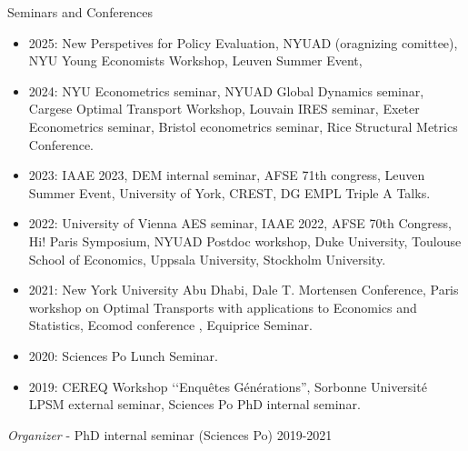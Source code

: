 \documentclass{resume} %
\begin{document}
\begin{rSection}{Seminars and Conferences}
\begin{itemize}
  \item 2025: New Perspetives for Policy Evaluation, NYUAD (oragnizing comittee), NYU Young Economists Workshop, Leuven Summer Event, 
  \item 2024: NYU Econometrics seminar, NYUAD Global Dynamics seminar, Cargese Optimal Transport Workshop, Louvain IRES seminar, Exeter Econometrics seminar, Bristol econometrics seminar, Rice Structural Metrics Conference.  
  \item 2023: IAAE 2023, DEM internal seminar, AFSE 71th congress, Leuven Summer Event, University of York, CREST, DG EMPL Triple A Talks.
  \item 2022: University of Vienna AES seminar, IAAE 2022, AFSE 70th Congress, Hi! Paris Symposium, NYUAD Postdoc workshop, Duke University, Toulouse School of Economics, Uppsala University, Stockholm University.
  \item 2021: New York University Abu Dhabi, Dale T. Mortensen Conference, Paris workshop on Optimal Transports with applications to Economics and Statistics, Ecomod conference , Equiprice Seminar.
  \item 2020: Sciences Po Lunch Seminar.
  \item 2019: CEREQ Workshop ‘‘Enquêtes Générations'', Sorbonne Université LPSM external seminar, Sciences Po PhD internal seminar.
\end{itemize}

{\em Organizer} - PhD internal seminar (Sciences Po) \hfill {2019-2021}

\end{rSection}
\end{document}
